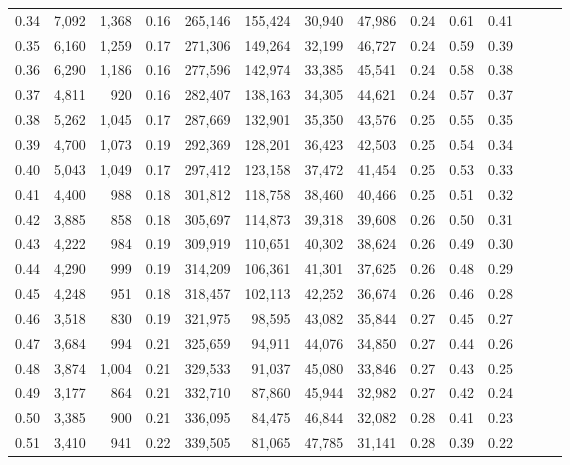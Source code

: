 \begin{tabular}{rrrrrrrrrrrrrr}
0.34 &   7,092 &  1,368 &  0.16 &  265,146 &  155,424 &  30,940 &  47,986 &  0.24 &  0.61 &      0.41 \\
0.35 &   6,160 &  1,259 &  0.17 &  271,306 &  149,264 &  32,199 &  46,727 &  0.24 &  0.59 &      0.39 \\
0.36 &   6,290 &  1,186 &  0.16 &  277,596 &  142,974 &  33,385 &  45,541 &  0.24 &  0.58 &      0.38 \\
0.37 &   4,811 &    920 &  0.16 &  282,407 &  138,163 &  34,305 &  44,621 &  0.24 &  0.57 &      0.37 \\
0.38 &   5,262 &  1,045 &  0.17 &  287,669 &  132,901 &  35,350 &  43,576 &  0.25 &  0.55 &      0.35 \\
0.39 &   4,700 &  1,073 &  0.19 &  292,369 &  128,201 &  36,423 &  42,503 &  0.25 &  0.54 &      0.34 \\
0.40 &   5,043 &  1,049 &  0.17 &  297,412 &  123,158 &  37,472 &  41,454 &  0.25 &  0.53 &      0.33 \\
0.41 &   4,400 &    988 &  0.18 &  301,812 &  118,758 &  38,460 &  40,466 &  0.25 &  0.51 &      0.32 \\
0.42 &   3,885 &    858 &  0.18 &  305,697 &  114,873 &  39,318 &  39,608 &  0.26 &  0.50 &      0.31 \\
0.43 &   4,222 &    984 &  0.19 &  309,919 &  110,651 &  40,302 &  38,624 &  0.26 &  0.49 &      0.30 \\
0.44 &   4,290 &    999 &  0.19 &  314,209 &  106,361 &  41,301 &  37,625 &  0.26 &  0.48 &      0.29 \\
0.45 &   4,248 &    951 &  0.18 &  318,457 &  102,113 &  42,252 &  36,674 &  0.26 &  0.46 &      0.28 \\
0.46 &   3,518 &    830 &  0.19 &  321,975 &   98,595 &  43,082 &  35,844 &  0.27 &  0.45 &      0.27 \\
0.47 &   3,684 &    994 &  0.21 &  325,659 &   94,911 &  44,076 &  34,850 &  0.27 &  0.44 &      0.26 \\
0.48 &   3,874 &  1,004 &  0.21 &  329,533 &   91,037 &  45,080 &  33,846 &  0.27 &  0.43 &      0.25 \\
0.49 &   3,177 &    864 &  0.21 &  332,710 &   87,860 &  45,944 &  32,982 &  0.27 &  0.42 &      0.24 \\
0.50 &   3,385 &    900 &  0.21 &  336,095 &   84,475 &  46,844 &  32,082 &  0.28 &  0.41 &      0.23 \\
0.51 &   3,410 &    941 &  0.22 &  339,505 &   81,065 &  47,785 &  31,141 &  0.28 &  0.39 &      0.22 \\

\end{tabular}

